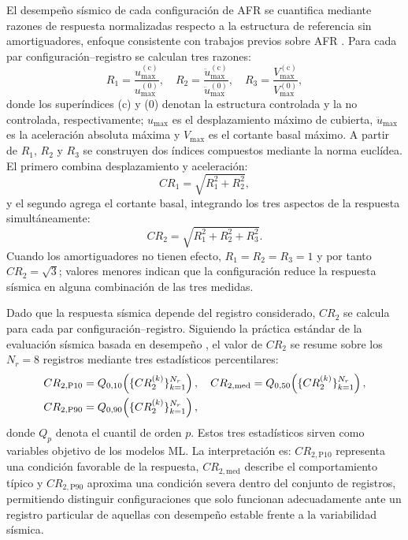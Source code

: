 \documentclass[preprint,12pt,authoryear]{elsarticle}
\newcommand{\CR}[1]{CR_{2,\text{#1}}}
\begin{document}
El desempeño sísmico de cada configuración de AFR se cuantifica mediante
razones de respuesta normalizadas respecto a la estructura de referencia sin
amortiguadores, enfoque consistente con trabajos previos sobre AFR
\citep{Namorado2024, Jarrahi2020jbe, Mualla2002}. Para cada par configuración--registro
se calculan tres razones:
\begin{equation}
    R_1 = \frac{u_{\max}^{(\mathrm{c})}}{u_{\max}^{(0)}}, \quad
    R_2 = \frac{\ddot{u}_{\max}^{(\mathrm{c})}}{\ddot{u}_{\max}^{(0)}}, \quad
    R_3 = \frac{V_{\max}^{(\mathrm{c})}}{V_{\max}^{(0)}},
    \label{eq:R_individual}
\end{equation}
donde los superíndices (c) y (0) denotan la estructura controlada y la no
controlada, respectivamente; $u_{\max}$ es el desplazamiento máximo de cubierta,
$\ddot{u}_{\max}$ es la aceleración absoluta máxima y $V_{\max}$ es el cortante
basal máximo. A partir de $R_1$, $R_2$ y $R_3$ se construyen dos índices compuestos
mediante la norma euclídea. El primero combina desplazamiento y aceleración:
\begin{equation}
    CR_1 = \sqrt{R_1^2 + R_2^2},
    \label{eq:CR1}
\end{equation}
y el segundo agrega el cortante basal, integrando los tres aspectos de la
respuesta simultáneamente:
\begin{equation}
    CR_2 = \sqrt{R_1^2 + R_2^2 + R_3^2}.
    \label{eq:CR2}
\end{equation}
Cuando los amortiguadores no tienen efecto, $R_1 = R_2 = R_3 = 1$ y por tanto
$CR_2 = \sqrt{3}$; valores menores indican que la configuración reduce la
respuesta sísmica en alguna combinación de las tres medidas.

Dado que la respuesta sísmica depende del registro considerado, $CR_2$ se calcula
para cada par configuración--registro. Siguiendo la práctica estándar de la
evaluación sísmica basada en desempeño \citep{Kazemi2022}, el valor de $CR_2$ se
resume sobre los $N_r = 8$ registros mediante tres estadísticos percentilares:
\begin{align}
    \CR{P10} &= Q_{0{,}10}\!\left(\{CR_2^{(k)}\}_{k=1}^{N_r}\right), \quad
    \CR{med}  = Q_{0{,}50}\!\left(\{CR_2^{(k)}\}_{k=1}^{N_r}\right), \notag\\
    \CR{P90} &= Q_{0{,}90}\!\left(\{CR_2^{(k)}\}_{k=1}^{N_r}\right),
    \label{eq:CR2stats}
\end{align}
donde $Q_p$ denota el cuantil de orden $p$. Estos tres estadísticos sirven como
variables objetivo de los modelos ML. La interpretación es: $\CR{P10}$
representa una condición favorable de la respuesta, $\CR{med}$ describe el
comportamiento típico y $\CR{P90}$ aproxima una condición severa dentro del
conjunto de registros, permitiendo distinguir configuraciones que solo funcionan
adecuadamente ante un registro particular de aquellas con desempeño estable
frente a la variabilidad sísmica.
\end{document}
